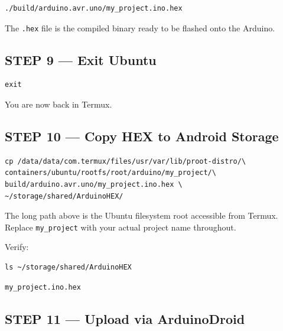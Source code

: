 \documentclass[12pt,a4paper,openany]{report}
\begin{document}
\begin{lstlisting}[style=terminal]
./build/arduino.avr.uno/my_project.ino.hex
\end{lstlisting}

The \texttt{.hex} file is the compiled binary ready to be flashed onto the Arduino.

\subsection{STEP 9 --- Exit Ubuntu}

\begin{lstlisting}[style=terminal]
exit
\end{lstlisting}

You are now back in Termux.

\subsection{STEP 10 --- Copy HEX to Android Storage}

\begin{lstlisting}[style=shell]
cp /data/data/com.termux/files/usr/var/lib/proot-distro/\
containers/ubuntu/rootfs/root/arduino/my_project/\
build/arduino.avr.uno/my_project.ino.hex \
~/storage/shared/ArduinoHEX/
\end{lstlisting}

\begin{notebox}
\color{TermWhite}\ttfamily\small
The long path above is the Ubuntu filesystem root accessible from Termux. Replace \texttt{my\_project} with your actual project name throughout.
\end{notebox}

Verify:

\begin{lstlisting}[style=shell]
ls ~/storage/shared/ArduinoHEX
\end{lstlisting}

\begin{lstlisting}[style=terminal]
my_project.ino.hex
\end{lstlisting}

\subsection{STEP 11 --- Upload via ArduinoDroid}
\end{document}
